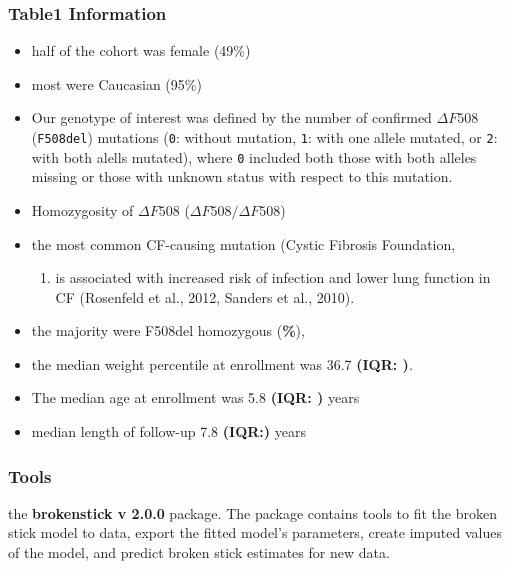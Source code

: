 \documentclass{article}
\providecommand{\tightlist}{%
  \setlength{\itemsep}{0pt}\setlength{\parskip}{0pt}}
\begin{document}
\hypertarget{table1-information}{%
\subsubsection{Table1 Information}\label{table1-information}}

\begin{itemize}
\item
  half of the cohort was female (49\%)
\item
  most were Caucasian (95\%)
\item
  Our genotype of interest was defined by the number of confirmed
  \(\Delta F508\) (\texttt{F508del}) mutations (\texttt{0}: without
  mutation, \texttt{1}: with one allele mutated, or \texttt{2}: with
  both alells mutated), where \texttt{0} included both those with both
  alleles missing or those with unknown status with respect to this
  mutation.
\item
  Homozygosity of \(\Delta F508\) (\(\Delta F508/\Delta F508\))
\item
  the most common CF-causing mutation (Cystic Fibrosis Foundation,

  \begin{enumerate}
  \def\labelenumi{\arabic{enumi})}
  \setcounter{enumi}{2015}
  \tightlist
  \item
    is associated with increased risk of infection and lower lung
    function in CF (Rosenfeld et al., 2012, Sanders et al., 2010).
  \end{enumerate}
\item
  the majority were F508del homozygous (\textbf{\%}),
\item
  the median weight percentile at enrollment was 36.7 \textbf{(IQR: )}.
\item
  The median age at enrollment was 5.8 \textbf{(IQR: )} years
\item
  median length of follow-up 7.8 \textbf{(IQR:)} years
\end{itemize}

\hypertarget{tools}{%
\subsubsection{Tools}\label{tools}}

the \textbf{brokenstick v 2.0.0} package. The package contains tools to
fit the broken stick model to data, export the fitted model's
parameters, create imputed values of the model, and predict broken stick
estimates for new data.
\end{document}
